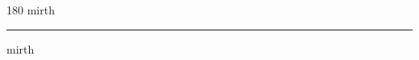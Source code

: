 
\begin{frame}
\begin{center}
\begin{turn}{180}
{\fontsize{2.5cm}{1em}\selectfont mirth}
\end{turn}
\vspace{1em}\par  
\hrule
\vspace{1em}\par  
{\fontsize{2.5cm}{1em}\selectfont mirth}
\end{center}
\end{frame}
